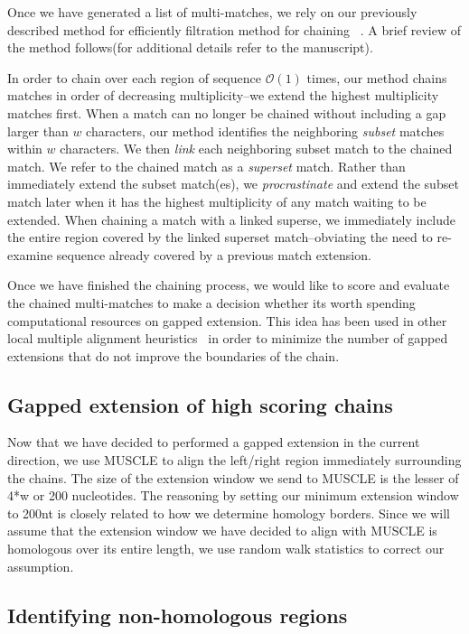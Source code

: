 \documentclass[twoside,11pt]{article}
\begin{document}
Once we have generated a list of multi-matches, we rely on our previously described method for efficiently filtration method for chaining ~\cite{ref-procrast}. A brief review of the method follows(for additional details refer to the manuscript).

In order to chain over each region of sequence $\mathcal{O}(1)$ times,
our method chains matches in order of decreasing multiplicity--we
extend the highest multiplicity matches first. When a match can no
longer be chained without including a gap larger than $w$
characters, our method identifies the neighboring \textit{subset}
matches within $w$ characters. We then \textit{link} each
neighboring subset match to the chained match. We refer to the
chained match as a \textit{superset} match. Rather than immediately
extend the subset match(es), we \textit{procrastinate} and extend
the subset match later when it has the highest multiplicity of any
match waiting to be extended. When chaining a match with a linked
superse, we
immediately include the entire region covered by the linked superset
match--obviating the need to re-examine sequence already covered by
a previous match extension.

Once we have finished the chaining process, we would like to score and evaluate the chained multi-matches to make a decision whether its worth spending computational resources on gapped extension. This idea has been used in other local multiple alignment heuristics~\cite{...} in order to minimize the number of gapped extensions that do not improve the boundaries of the chain.

\subsection{Gapped extension of high scoring chains}

Now that we have decided to performed a gapped extension in the current direction, we use MUSCLE to align the left/right region immediately surrounding the chains. The size of the extension window we send to MUSCLE is the lesser of 4*w or 200 nucleotides. The reasoning by setting our minimum extension window to 200nt is closely related to how we determine homology borders. Since we will assume that the extension window we have decided to align with MUSCLE is homologous over its entire length, we use random walk statistics to correct our assumption.

\subsection{Identifying non-homologous regions}
\end{document}
